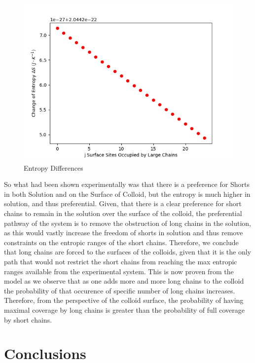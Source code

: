 \documentclass[journal=jacsat,manuscript=article]{achemso}
\begin{document}
\begin{figure}[H]
\includegraphics[scale=0.5]{fig12.png}
\caption{Entropy Differences}
\label{figure 12}
\end{figure}


So what had been shown experimentally was that there is a preference for Shorts in both Solution and on the Surface of Colloid, but the entropy is much higher in solution, and thus preferential. Given, that there is a clear preference for short chains to remain in the solution over the surface of the colloid, the preferential pathway of the system is to remove the obstruction of long chains in the solution, as this would vastly increase the freedom  of shorts in solution and thus remove constraints on the entropic ranges of the short chains. Therefore, we conclude that long chains are forced to the surfaces of the colloids, given that it is the only path that would not restrict the short chains from reaching the max entropic ranges available from the experimental system. This is now proven from the model as we observe that as one adds more and more long chains to the colloid the probability of that occurence of specific number of long chains increases. Therefore, from the perspective of the colloid surface, the probability of having maximal coverage by long chains is greater than the probability of full coverage by short chains.
\section{Conclusions}
\end{document}
